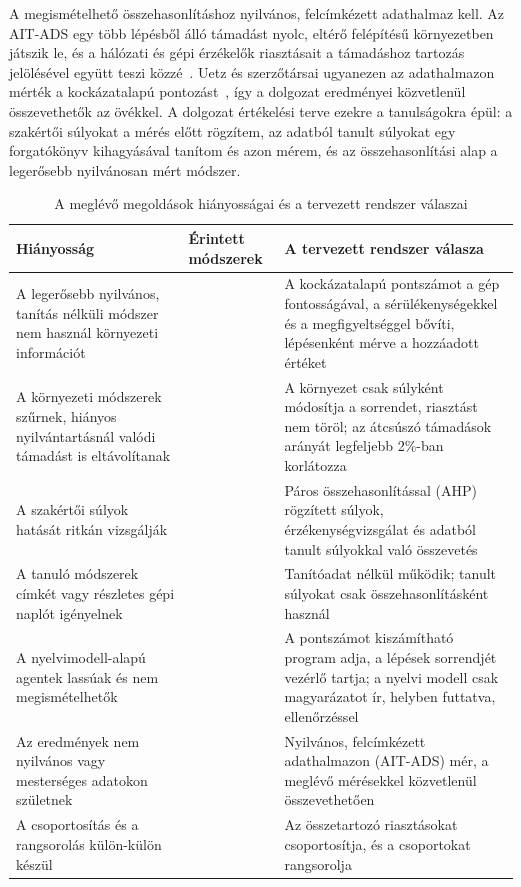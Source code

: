A megismételhető összehasonlításhoz nyilvános, felcímkézett adathalmaz kell. Az AIT-ADS egy több lépésből álló támadást nyolc, eltérő felépítésű környezetben játszik le, és a hálózati és gépi érzékelők riasztásait a támadáshoz tartozás jelölésével együtt teszi közzé~\cite{landauer2024aitads}. Uetz és szerzőtársai ugyanezen az adathalmazon mérték a kockázatalapú pontozást~\cite{uetz2026rba}, így a dolgozat eredményei közvetlenül összevethetők az övékkel. A dolgozat értékelési terve ezekre a tanulságokra épül: a szakértői súlyokat a mérés előtt rögzítem, az adatból tanult súlyokat egy forgatókönyv kihagyásával tanítom és azon mérem, és az összehasonlítási alap a legerősebb nyilvánosan mért módszer.

\begin{table}[H]
    \centering
    \caption{A meglévő megoldások hiányosságai és a tervezett rendszer válaszai}
    \label{tab:resek}
    \small
    \begin{tabular}{|L{4.4cm}|L{2.6cm}|L{6.6cm}|}
        \hline
        \textbf{Hiányosság} & \textbf{Érintett módszerek} & \textbf{A tervezett rendszer válasza} \\ \hline
        A legerősebb nyilvános, tanítás nélküli módszer nem használ környezeti információt & \cite{uetz2026rba} & A kockázatalapú pontszámot a gép fontosságával, a sérülékenységekkel és a megfigyeltséggel bővíti, lépésenként mérve a hozzáadott értéket \\ \hline
        A környezeti módszerek szűrnek, hiányos nyilvántartásnál valódi támadást is eltávolítanak & \cite{njogu2012,sommestad2015} & A környezet csak súlyként módosítja a sorrendet, riasztást nem töröl; az átcsúszó támadások arányát legfeljebb 2\%-ban korlátozza \\ \hline
        A szakértői súlyok hatását ritkán vizsgálják & \cite{anuar2012} & Páros összehasonlítással (\ac{AHP}) rögzített súlyok, érzékenységvizsgálat és adatból tanult súlyokkal való összevetés \\ \hline
        A tanuló módszerek címkét vagy részletes gépi naplót igényelnek & \cite{wang2024alertpro,hassan2019} & Tanítóadat nélkül működik; tanult súlyokat csak összehasonlításként használ \\ \hline
        A nyelvimodell-alapú agentek lassúak és nem megismételhetők & \cite{wei2025cortex,liu2026hesp} & A pontszámot kiszámítható program adja, a lépések sorrendjét vezérlő tartja; a nyelvi modell csak magyarázatot ír, helyben futtatva, ellenőrzéssel \\ \hline
        Az eredmények nem nyilvános vagy mesterséges adatokon születnek & \cite{ndichu2026,roy2026agentsoc} & Nyilvános, felcímkézett adathalmazon (AIT-ADS) mér, a meglévő mérésekkel közvetlenül összevethetően \\ \hline
        A csoportosítás és a rangsorolás külön-külön készül & \cite{landauer2022,uetz2026rba} & Az összetartozó riasztásokat csoportosítja, és a csoportokat rangsorolja \\ \hline
    \end{tabular}
\end{table}